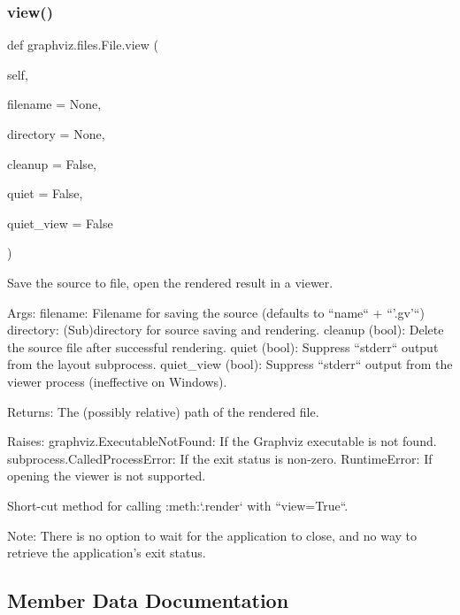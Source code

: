 \subsubsection{\texorpdfstring{view()}{view()}}
{\footnotesize\ttfamily def graphviz.\+files.\+File.\+view (\begin{DoxyParamCaption}\item[{}]{self,  }\item[{}]{filename = {\ttfamily None},  }\item[{}]{directory = {\ttfamily None},  }\item[{}]{cleanup = {\ttfamily False},  }\item[{}]{quiet = {\ttfamily False},  }\item[{}]{quiet\+\_\+view = {\ttfamily False} }\end{DoxyParamCaption})}

\begin{DoxyVerb}Save the source to file, open the rendered result in a viewer.

Args:
    filename: Filename for saving the source (defaults to ``name`` + ``'.gv'``)
    directory: (Sub)directory for source saving and rendering.
    cleanup (bool): Delete the source file after successful rendering.
    quiet (bool): Suppress ``stderr`` output from the layout subprocess.
    quiet_view (bool): Suppress ``stderr`` output from the viewer process
               (ineffective on Windows).

Returns:
    The (possibly relative) path of the rendered file.

Raises:
    graphviz.ExecutableNotFound: If the Graphviz executable is not found.
    subprocess.CalledProcessError: If the exit status is non-zero.
    RuntimeError: If opening the viewer is not supported.

Short-cut method for calling :meth:`.render` with ``view=True``.

Note:
    There is no option to wait for the application to close, and no way
    to retrieve the application's exit status.
\end{DoxyVerb}
 

\subsection{Member Data Documentation}
\mbox{\label{classgraphviz_1_1files_1_1File_a17fd3abb3628eca94effe35cf1237a73}} 

